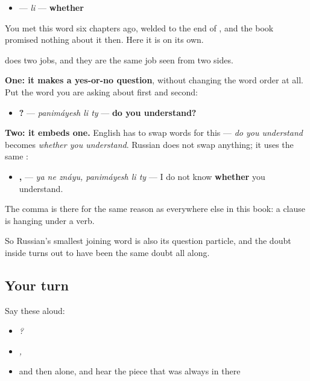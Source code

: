 \begin{grammarlens}[title={Grammar lens — the doubting particle, alone}]
\begin{itemize}
\raggedright
  \item \textbf{} — \emph{li} — \textbf{whether}
\end{itemize}

You met this word six chapters ago, welded to the end of \textbf{}, and the book promised nothing about it then. Here it is on its own.

\textbf{} does two jobs, and they are the same job seen from two sides.

\textbf{One: it makes a yes-or-no question}, without changing the word order at all. Put the word you are asking about first and \textbf{} second:

\begin{itemize}
\raggedright
  \item \textbf{  ?} — \emph{panimáyesh li ty} — \textbf{do you understand?}
\end{itemize}

\textbf{Two: it embeds one.} English has to swap words for this — \emph{do you understand} becomes \emph{whether you understand}. Russian does not swap anything; it uses the same \textbf{}:

\begin{itemize}
\raggedright
  \item \textbf{  ,   } — \emph{ya ne znáyu, panimáyesh li ty} — I do not know \textbf{whether} you understand.
\end{itemize}

The comma is there for the same reason as everywhere else in this book: a clause is hanging under a verb.

So Russian's smallest joining word is also its question particle, and the doubt inside \textbf{} turns out to have been the same doubt all along.
\end{grammarlens}

\subsection*{Your turn}
Say these aloud:

\begin{itemize}
\raggedright
  \item \emph{  ?}
  \item \emph{  ,   }
  \item \emph{} and then \textbf{} alone, and hear the piece that was always in there
\end{itemize}

